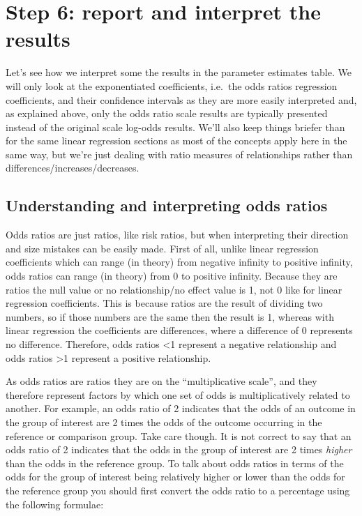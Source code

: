 \documentclass[
]{book}
\begin{document}
\hypertarget{step-6-report-and-interpret-the-results-1}{%
\section{Step 6: report and interpret the results}\label{step-6-report-and-interpret-the-results-1}}

Let's see how we interpret some the results in the parameter estimates table. We will only look at the exponentiated coefficients, i.e.~the odds ratios regression coefficients, and their confidence intervals as they are more easily interpreted and, as explained above, only the odds ratio scale results are typically presented instead of the original scale log-odds results. We'll also keep things briefer than for the same linear regression sections as most of the concepts apply here in the same way, but we're just dealing with ratio measures of relationships rather than differences/increases/decreases.

\hypertarget{understanding-and-interpreting-odds-ratios}{%
\subsection{Understanding and interpreting odds ratios}\label{understanding-and-interpreting-odds-ratios}}

Odds ratios are just ratios, like risk ratios, but when interpreting their direction and size mistakes can be easily made. First of all, unlike linear regression coefficients which can range (in theory) from negative infinity to positive infinity, odds ratios can range (in theory) from 0 to positive infinity. Because they are ratios the null value or no relationship/no effect value is 1, not 0 like for linear regression coefficients. This is because ratios are the result of dividing two numbers, so if those numbers are the same then the result is 1, whereas with linear regression the coefficients are differences, where a difference of 0 represents no difference. Therefore, odds ratios \textless1 represent a negative relationship and odds ratios \textgreater1 represent a positive relationship.

As odds ratios are ratios they are on the ``multiplicative scale'', and they therefore represent factors by which one set of odds is multiplicatively related to another. For example, an odds ratio of 2 indicates that the odds of an outcome in the group of interest are 2 times the odds of the outcome occurring in the reference or comparison group. Take care though. It is not correct to say that an odds ratio of 2 indicates that the odds in the group of interest are 2 times \emph{higher} than the odds in the reference group. To talk about odds ratios in terms of the odds for the group of interest being relatively higher or lower than the odds for the reference group you should first convert the odds ratio to a percentage using the following formulae:
\end{document}
